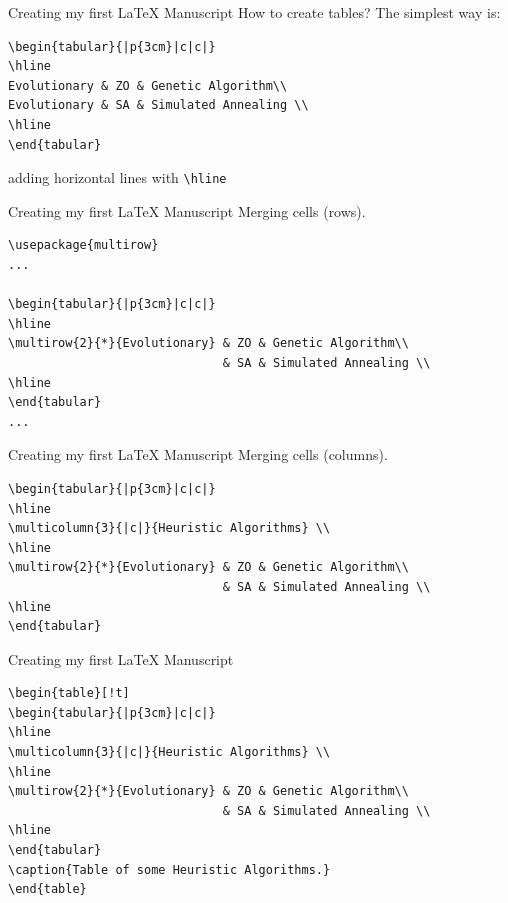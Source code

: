 \begin{frame}[fragile]{Creating my first \LaTeX{} Manuscript}
How to create tables? The simplest way is:
\footnotesize
\begin{verbatim}
\begin{tabular}{|p{3cm}|c|c|}
\hline
Evolutionary & ZO & Genetic Algorithm\\ 
Evolutionary & SA & Simulated Annealing \\ 
\hline
\end{tabular}
\end{verbatim}
adding horizontal lines with \verb!\hline!
\end{frame}


\begin{frame}[fragile]{Creating my first \LaTeX{} Manuscript}
Merging cells (rows).
\footnotesize
\begin{verbatim}
\usepackage{multirow}
...

\begin{tabular}{|p{3cm}|c|c|}
\hline
\multirow{2}{*}{Evolutionary} & ZO & Genetic Algorithm\\ 
                              & SA & Simulated Annealing \\ 
\hline
\end{tabular}
...

\end{verbatim}
\end{frame}


\begin{frame}[fragile]{Creating my first \LaTeX{} Manuscript}
Merging cells (columns).
\footnotesize
\begin{verbatim}
\begin{tabular}{|p{3cm}|c|c|}
\hline
\multicolumn{3}{|c|}{Heuristic Algorithms} \\
\hline
\multirow{2}{*}{Evolutionary} & ZO & Genetic Algorithm\\ 
                              & SA & Simulated Annealing \\ 
\hline
\end{tabular}
\end{verbatim}
\end{frame}

\begin{frame}[fragile]{Creating my first \LaTeX{} Manuscript}
\footnotesize
\begin{verbatim}
\begin{table}[!t]
\begin{tabular}{|p{3cm}|c|c|}
\hline
\multicolumn{3}{|c|}{Heuristic Algorithms} \\
\hline
\multirow{2}{*}{Evolutionary} & ZO & Genetic Algorithm\\ 
                              & SA & Simulated Annealing \\ 
\hline
\end{tabular}
\caption{Table of some Heuristic Algorithms.}
\end{table}
\end{verbatim}
\end{frame}


